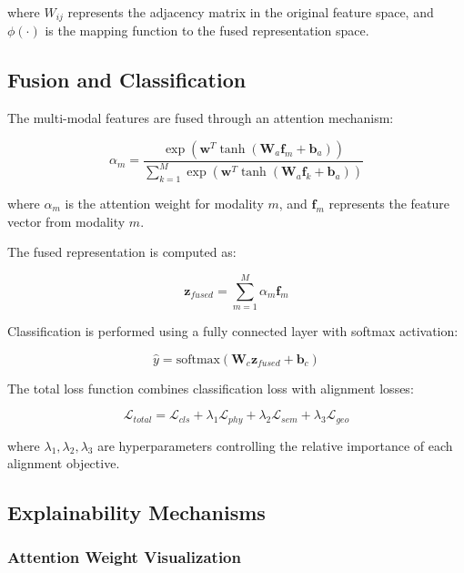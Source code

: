 \documentclass[journal]{IEEEtran}
\begin{document}
where $W_{ij}$ represents the adjacency matrix in the original feature space, and $\phi(\cdot)$ is the mapping function to the fused representation space.

\subsection{Fusion and Classification}

The multi-modal features are fused through an attention mechanism:

\begin{equation}
\alpha_m = \frac{\exp(\mathbf{w}^T \tanh(\mathbf{W}_a \mathbf{f}_m + \mathbf{b}_a))}{\sum_{k=1}^{M} \exp(\mathbf{w}^T \tanh(\mathbf{W}_a \mathbf{f}_k + \mathbf{b}_a))}
\end{equation}

where $\alpha_m$ is the attention weight for modality $m$, and $\mathbf{f}_m$ represents the feature vector from modality $m$.

The fused representation is computed as:

\begin{equation}
\mathbf{z}_{fused} = \sum_{m=1}^{M} \alpha_m \mathbf{f}_m
\end{equation}

Classification is performed using a fully connected layer with softmax activation:

\begin{equation}
\hat{y} = \text{softmax}(\mathbf{W}_c \mathbf{z}_{fused} + \mathbf{b}_c)
\end{equation}

The total loss function combines classification loss with alignment losses:

\begin{equation}
\mathcal{L}_{total} = \mathcal{L}_{cls} + \lambda_1 \mathcal{L}_{phy} + \lambda_2 \mathcal{L}_{sem} + \lambda_3 \mathcal{L}_{geo}
\end{equation}

where $\lambda_1, \lambda_2, \lambda_3$ are hyperparameters controlling the relative importance of each alignment objective.

\subsection{Explainability Mechanisms}

\subsubsection{Attention Weight Visualization}
\end{document}

